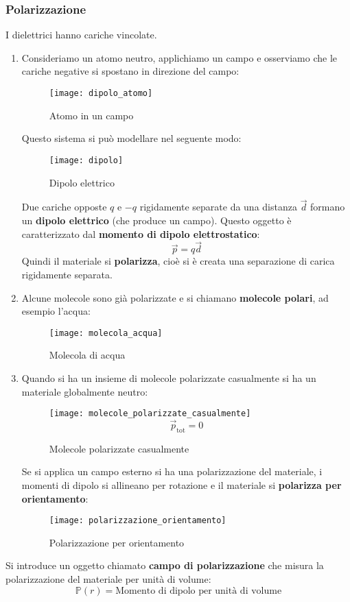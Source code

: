 \documentclass[a4paper]{article}
\begin{document}
\subsubsection{Polarizzazione}
I dielettrici hanno cariche vincolate.

\begin{enumerate}
  \item 
    Consideriamo un atomo neutro,
    applichiamo un campo e osserviamo che le cariche negative si spostano in direzione
    del campo:
    \begin{figure}[H]
      \centering
      \texttt{[image: dipolo\_atomo]}
      \caption{Atomo in un campo}
    \end{figure}
    \noindent
    Questo sistema si può modellare nel seguente modo:
    \begin{figure}[H]
      \centering
      \texttt{[image: dipolo]}
      \caption{Dipolo elettrico}
    \end{figure}
    \noindent
    Due cariche opposte \( q \) e \( -q \) rigidamente separate da una distanza \( \vec{d} \)
    formano un \textbf{dipolo elettrico} (che produce un campo). Questo oggetto è caratterizzato dal
    \textbf{momento di dipolo elettrostatico}:
    \[
      \vec{p} = q \vec{d}
    \] 
    Quindi il materiale si \textbf{polarizza}, cioè si è creata una separazione di carica
    rigidamente separata.

  \item 
    Alcune molecole sono già polarizzate e si chiamano \textbf{molecole polari}, ad esempio
    l'acqua:
    \begin{figure}[H]
      \centering
      \texttt{[image: molecola\_acqua]}
      \caption{Molecola di acqua}
    \end{figure}

  \item 
    Quando si ha un insieme di molecole polarizzate casualmente si ha un materiale
    globalmente neutro:
    \begin{figure}[H]
      \centering
      \texttt{[image: molecole\_polarizzate\_casualmente]}
      \[
        \vec{p}_{\text{tot}} = 0
      \] 
      \caption{Molecole polarizzate casualmente}
    \end{figure}
    \noindent
    Se si applica un campo esterno si ha una polarizzazione del materiale, i momenti
    di dipolo si allineano per rotazione e il materiale si \textbf{polarizza per
    orientamento}:
    \begin{figure}[H]
      \centering
      \texttt{[image: polarizzazione\_orientamento]}
      \caption{Polarizzazione per orientamento}
    \end{figure}
\end{enumerate}
\vspace{1em}
\noindent
Si introduce un oggetto chiamato \textbf{campo di polarizzazione} che misura
la polarizzazione del materiale per unità di volume:
\[
  \mathbb{P}(r) = \text{Momento di dipolo per unità di volume}
\] 
\end{document}
